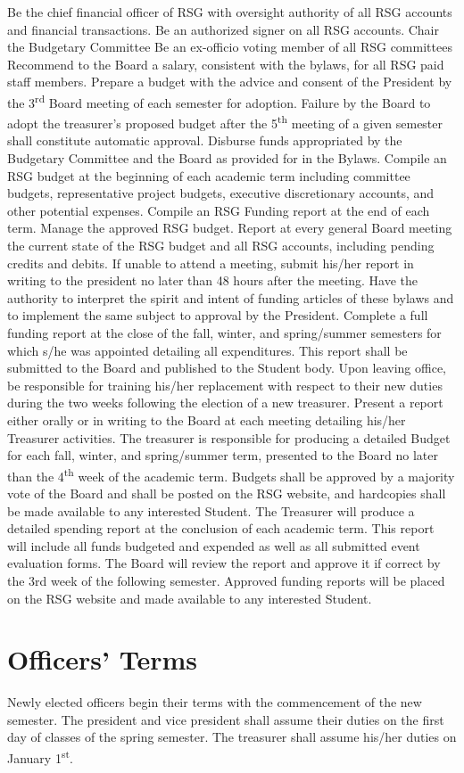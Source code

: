 \begin{enumsubsection}
\begin{enumsubsubsection}
\itemnotoc Be the chief financial officer of RSG with oversight authority of all RSG 
accounts and financial transactions.
\itemnotoc Be an authorized signer on all RSG accounts. 
\itemnotoc Chair the Budgetary Committee
\itemnotoc Be an ex-officio voting member of all RSG committees
\itemnotoc Recommend to the Board a salary, consistent with the bylaws, for all RSG 
paid staff members.
\itemnotoc Prepare a budget with the advice and consent of the President by the 3\textsuperscript{rd} 
Board meeting of each semester for adoption. Failure by the Board to 
adopt the treasurer's proposed budget after the 5\textsuperscript{th} meeting of a given 
semester shall constitute automatic approval. 
\itemnotoc Disburse funds appropriated by the Budgetary Committee and the Board 
as provided for in the Bylaws. 
\itemnotoc Compile an RSG budget at the beginning of each academic term including 
committee budgets, representative project budgets, executive 
discretionary accounts, and other potential expenses.
\itemnotoc Compile an RSG Funding report at the end of each term. 
\itemnotoc Manage the approved RSG budget.
\itemnotoc Report at every general Board meeting the current state of the RSG 
budget and all RSG accounts, including pending credits and debits. 
\itemnotoc If unable to attend a meeting, submit his/her report in writing to the 
president no later than 48 hours after the meeting. 
\itemnotoc Have the authority to interpret the spirit and intent of funding articles of 
these bylaws and to implement the same subject to approval by the 
President.
\itemnotoc Complete a full funding report at the close of the fall, winter, and 
spring/summer semesters for which s/he was appointed detailing all 
expenditures. This report shall be submitted to the Board and published to 
the Student body. 
\itemnotoc Upon leaving office, be responsible for training his/her replacement with 
respect to their new duties during the two weeks following the election of a 
new treasurer. 
\itemnotoc Present a report either orally or in writing to the Board at each meeting 
detailing his/her Treasurer activities. 
\itemnotoc The treasurer is responsible for producing a detailed Budget for each fall,
winter, and spring/summer term, presented to the Board no later than the 
4\textsuperscript{th} week of the academic term. Budgets shall be approved by a majority 
vote of the Board and shall be posted on the RSG website, and 
hardcopies shall be made available to any interested Student. 
\itemnotoc The Treasurer will produce a detailed spending report at the conclusion of 
each academic term. This report will include all funds budgeted and 
expended as well as all submitted event evaluation forms. The Board will 
review the report and approve it if correct by the 3rd week of the following 
semester. Approved funding reports will be placed on the RSG website 
and made available to any interested Student. 
\end{enumsubsubsection}
\end{enumsubsection}
\section{Officers' Terms} Newly elected officers begin their terms with the commencement of 
the new semester. The president and vice president shall assume their 
duties on the first day of classes of the spring semester. The treasurer shall 
assume his/her duties on January 1\textsuperscript{st}.